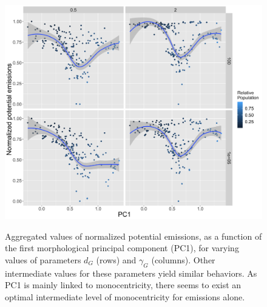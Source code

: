 \documentclass{jimis-en}
\begin{document}
\begin{figure}[ht] 
  {\includegraphics[width=\linewidth]{figures/aggreg_morpho_pc1-emissions_targeted.png}}
  \centering
  \caption{Aggregated values of normalized potential emissions, as a function of the first morphological principal component (PC1), for varying values of parameters $d_G$ (rows) and $\gamma_G$ (columns). Other intermediate values for these parameters yield similar behaviors. As PC1 is mainly linked to monocentricity, there seems to exist an optimal intermediate level of monocentricity for emissions alone.\label{fig:emissions-pc1}}
\end{figure}







\end{document}
